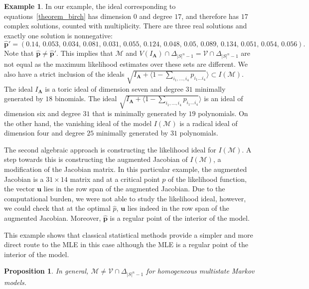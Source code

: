 \documentclass[11pt, a4paper]{article}
\numberwithin{equation}{section}
\theoremstyle{plain}
\newtheorem{proposition}[theorem]{Proposition}
\theoremstyle{definition}
\newtheorem{example}{Example}
\begin{document}
\begin{example}
In our example, the ideal corresponding to equations~\eqref{theorem_birch} has dimension $0$ and degree $17$, and therefore has
$17$ complex solutions, counted with multiplicity. There are three real solutions and exactly one solution is nonnegative:
\[
\hat{\textbf{p}}' = (0.14,\, 0.053,\, 0.034,\, 0.081,\, 0.031,\, 0.055,\, 0.124,\, 0.048,\, 0.05,\, 0.089,\, 0.134,\, 0.051,\, 0.054,\, 0.056).
\]
Note that $\hat{\textbf{p}}\neq \hat{\textbf{p}}'$. 
This implies that $\mathcal{M}$ and $\textstyle{V(I_{\textbf{A}}) \cap \Delta_{|S|^n-1}=\mathcal{V} \cap \Delta_{|S|^n-1}}$ are not equal as the maximum likelihood estimates over these sets are different. We also have a strict inclusion of the ideals  $\textstyle{\sqrt{I_{\textbf{A}} + \langle 1-\sum_{i_1,\ldots, i_4}p_{i_1\ldots i_4}}\rangle \subset I(\mathcal{M})}$.  The ideal $I_{\textbf{A}}$ is a toric ideal of dimension seven and degree $31$ minimally generated by $18$ binomials. The ideal $\textstyle{\sqrt{I_{\textbf{A}} + \langle 1-\sum_{i_1,\ldots, i_4}p_{i_1\ldots i_4}}\rangle}$ is an ideal of dimension six and degree $31$ that is minimally generated by $19$ polynomials. On the other hand, the vanishing ideal of the model $I(\mathcal{M})$ is a radical ideal of dimension four and degree $25$ minimally generated by $31$ polynomials. 

The second algebraic approach is constructing the likelihood ideal for $I(\mathcal{M})$. A step towards this is constructing the augmented Jacobian of $I(\mathcal{M})$, a modification of the Jacobian matrix. In this particular example, the augmented Jacobian is a $31 \times 14$ matrix and at a critical point $p$ of the likelihood function, the vector $\textbf{u}$ lies in the row span of the augmented Jacobian. Due to the computational burden, we were not able to study the likelihood ideal, however, we could check that at the optimal $\hat{p}$, $\textbf{u}$ lies indeed in the row span of the augmented Jacobian. Moreover, $\hat{\textbf{p}}$ is a regular point of the interior of the model.

This example shows that
classical statistical methods provide a simpler and more direct route to the MLE in this case although the MLE is a regular point of the interior of the model.
\end{example}

\begin{proposition} \label{prop:model_is_not_equal_to_variety_interesected_with_probability_simplex}
In general, $\mathcal{M} \neq \mathcal{V} \cap \Delta_{|S|^n-1}$ for homogeneous multistate Markov models.
\end{proposition}
\end{document}
